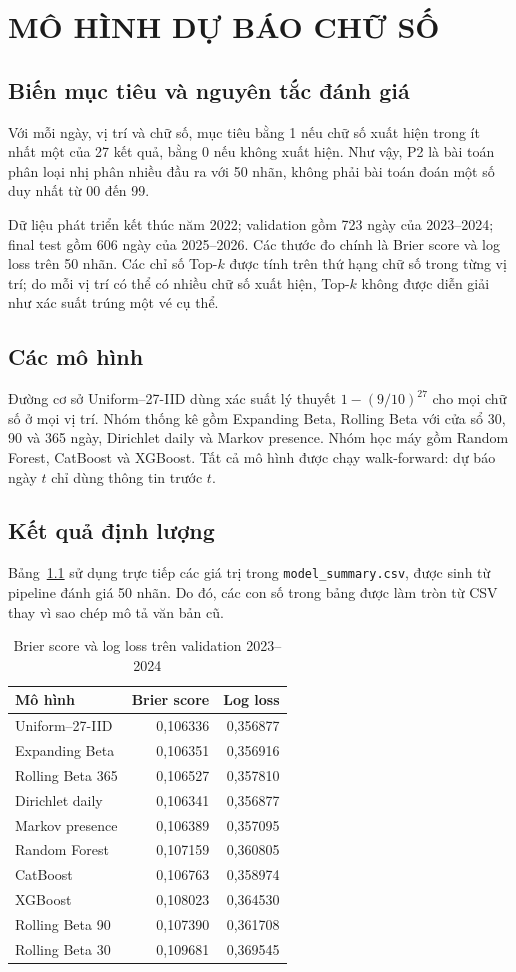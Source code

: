\chapter{MÔ HÌNH DỰ BÁO CHỮ SỐ}
\section{Biến mục tiêu và nguyên tắc đánh giá}
Với mỗi ngày, vị trí và chữ số, mục tiêu bằng 1 nếu chữ số xuất hiện trong ít nhất một của 27 kết quả, bằng 0 nếu không xuất hiện. Như vậy, P2 là bài toán phân loại nhị phân nhiều đầu ra với 50 nhãn, không phải bài toán đoán một số duy nhất từ 00 đến 99.

Dữ liệu phát triển kết thúc năm 2022; validation gồm 723 ngày của 2023--2024; final test gồm 606 ngày của 2025--2026. Các thước đo chính là Brier score và log loss trên 50 nhãn. Các chỉ số Top-$k$ được tính trên thứ hạng chữ số trong từng vị trí; do mỗi vị trí có thể có nhiều chữ số xuất hiện, Top-$k$ không được diễn giải như xác suất trúng một vé cụ thể.

\section{Các mô hình}
Đường cơ sở Uniform--27-IID dùng xác suất lý thuyết $1-(9/10)^{27}$ cho mọi chữ số ở mọi vị trí. Nhóm thống kê gồm Expanding Beta, Rolling Beta với cửa sổ 30, 90 và 365 ngày, Dirichlet daily và Markov presence. Nhóm học máy gồm Random Forest, CatBoost và XGBoost. Tất cả mô hình được chạy walk-forward: dự báo ngày $t$ chỉ dùng thông tin trước $t$.

\section{Kết quả định lượng}
Bảng~\ref{tab:p2-validation} sử dụng trực tiếp các giá trị trong \texttt{model\_summary.csv}, được sinh từ pipeline đánh giá 50 nhãn. Do đó, các con số trong bảng được làm tròn từ CSV thay vì sao chép mô tả văn bản cũ.
\begin{table}[H]\centering\small
\caption{Brier score và log loss trên validation 2023--2024}\label{tab:p2-validation}
\begin{tabular}{lrr}\toprule
Mô hình & Brier score & Log loss\\\midrule
Uniform--27-IID & 0,106336 & 0,356877\\
Expanding Beta & 0,106351 & 0,356916\\
Rolling Beta 365 & 0,106527 & 0,357810\\
Dirichlet daily & 0,106341 & 0,356877\\
Markov presence & 0,106389 & 0,357095\\
Random Forest & 0,107159 & 0,360805\\
CatBoost & 0,106763 & 0,358974\\
XGBoost & 0,108023 & 0,364530\\
Rolling Beta 90 & 0,107390 & 0,361708\\
Rolling Beta 30 & 0,109681 & 0,369545\\\bottomrule
\end{tabular}\end{table}

